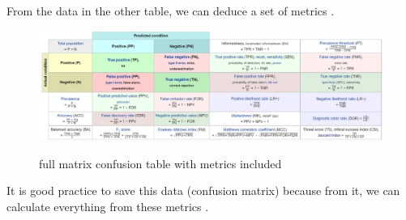 From the data in the other table, we can deduce a set of metrics \citet{matrixAi}. 



\begin{figure}[ht] \centering \includegraphics[scale=0.43]{figures/diagram.png} \caption{full matrix confusion table with metrics included}\citet{matrixC}  \label{fig:conf} \end{figure} 

It is good practice to save this data (confusion matrix) because from it, we can calculate everything from these metrics \citet{Powers2011}.




